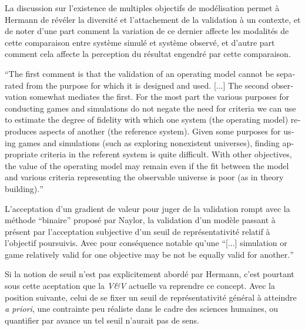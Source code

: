 La discussion sur l'existence de multiples objectifs de modélisation permet à Hermann de révéler la diversité et l'attachement de la validation à un contexte, et de noter d'une part comment la variation de ce dernier affecte les modalités de cette comparaison entre système simulé et système observé, et d'autre part comment cela affecte la perception du résultat engendré par cette comparaison.

\foreignquote{english}{The first comment is that the validation of an operating model cannot be separated from the purpose for which it is designed and used. [...] The second observation somewhat mediates the first. For the most part the various purposes for conducting games and simulations do not negate the need for criteria we can use to estimate the degree of fidelity with which one system (the operating model) reproduces aspects of another (the reference system). Given some purposes for using games and simulations (such as exploring nonexistent universes), finding appropriate criteria in the referent system is quite difficult. With other objectives, the value of the operating model may remain even if the fit between the model and various criteria representing the observable universe is poor (as in theory building).} \autocite[219]{Hermann1967}


L'acceptation d'un gradient de valeur pour juger de la validation rompt avec la méthode \enquote{binaire} proposé par Naylor, la validation d'un modèle passant à présent par l'acceptation subjective d'un seuil de représentativité relatif à l'objectif poursuivis. Avec pour conséquence notable qu'une \foreignquote{english}{[...] simulation or game relatively valid for one objective may be not be equally valid for another.}

Si la notion de seuil n'est pas explicitement abordé par Hermann, c'est pourtant sous cette aceptation que la \textit{V\&V} actuelle va reprendre ce concept. Avec la position suivante, celui de se fixer un seuil de représentativité général à atteindre \textit{a priori}, une contrainte peu réaliste dans le cadre des sciences humaines, ou quantifier par avance un tel seuil n'aurait pas de sens. 

